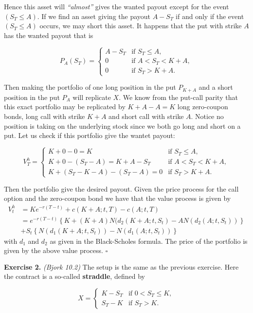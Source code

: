 \documentclass[a4paper,12pt,openany]{book}
\begin{document}
Hence this asset will \emph{``almost''} gives the wanted payout except for the event \((S_T\le A)\). If we find an asset giving the payout \(A-S_T\) if and only if the event \((S_T\le A)\) occurs, we may short this asset. It happens that the put with strike \(A\) has the wanted payout that is

\[
P_{A}(S_T)=
\begin{cases}
  A-S_T & \text{if }S_T\le A,\\
  0 & \text{if }A<S_T<K+ A,\\
  0 & \text{if }S_T > K+ A.
\end{cases}
\]

Then making the portfolio of one long position in the put \(P_{K+A}\) and a short position in the put \(P_A\) will replicate \(X\). We know from the put-call parity that this exact portfolio may be replicated by \(K+A-A=K\) long zero-coupon bonds, long call with strike \(K+A\) and short call with strike \(A\). Notice no position is taking on the underlying stock since we both go long and short on a put. Let us check if this portfolio give the wantet payout:

\[
V^h_T=
\begin{cases}
  K +0-0 = K & \text{if }S_T\le A,\\
  K + 0 - (S_T-A)=K+A-S_T & \text{if }A<S_T<K+ A,\\
  K + (S_T-K-A)-(S_T-A)=0 & \text{if }S_T > K+ A.
\end{cases}
\]

Then the portfolio give the desired payout. Given the price process for the call option and the zero-coupon bond we have that the value process is given by
\begin{align*}
V_t^h&=Ke^{-r(T-t)}+c(K+A;t,T)-c(A;t,T)\\
&=e^{-r(T-t)}\left\{K+(K+A)N(d_2(K+A;t,S_t)-AN(d_2(A;t,S_t))\right\}\\
&+S_t\left\{N(d_1(K+A;t,S_t))-N(d_1(A;t,S_t))\right\}
\end{align*}
with \(d_1\) and \(d_2\) as given in the Black-Scholes formula. The price of the portfolio is given by the above value process. \(\square\)

\textbf{Exercise 2.} \emph{(Bjork 10.2)} The setup is the same as the previous exercise. Here the contract is a so-called \textbf{straddle}, defined by

\[
X=
\begin{cases}
  K-S_T & \text{if }0<S_T\le K,\\
  S_T-K & \text{if }S_T>K.
\end{cases}
\]
\end{document}
